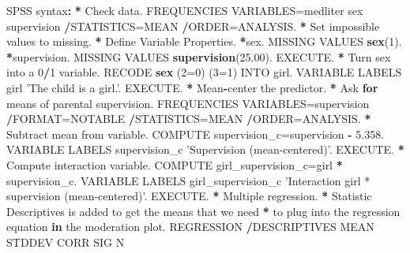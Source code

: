 \documentclass[a4paper]{book}
\newenvironment{Shaded}{\begin{snugshade}}{\end{snugshade}}
\newcommand{\KeywordTok}[1]{\textcolor[rgb]{0,0,0}{\textbf{#1}}}
\newcommand{\DecValTok}[1]{\textcolor[rgb]{0.00,0.00,0.00}{#1}}
\newcommand{\FloatTok}[1]{\textcolor[rgb]{0.00,0.00,0.00}{#1}}
\newcommand{\StringTok}[1]{\textcolor[rgb]{0.00,0.00,0.00}{#1}}
\newcommand{\ControlFlowTok}[1]{\textcolor[rgb]{0.00,0.00,0.00}{\textbf{#1}}}
\newcommand{\OperatorTok}[1]{\textcolor[rgb]{0.00,0.00,0.00}{\textbf{#1}}}
\newcommand{\ErrorTok}[1]{\textcolor[rgb]{0.00,0.00,0.00}{\textbf{#1}}}
\newcommand{\NormalTok}[1]{#1}
\theoremstyle{definition}
\theoremstyle{definition}
\theoremstyle{definition}
\theoremstyle{remark}
\begin{document}
\begin{Shaded}
\begin{Highlighting}[]
\NormalTok{SPSS syntax}\OperatorTok{:}\StringTok{  }
\StringTok{  }
\ErrorTok{*}\StringTok{ }\NormalTok{Check data.  }
\NormalTok{FREQUENCIES VARIABLES=medliter sex supervision  }
  \OperatorTok{/}\NormalTok{STATISTICS=MEAN  }
  \OperatorTok{/}\NormalTok{ORDER=ANALYSIS.  }
\OperatorTok{*}\StringTok{ }\NormalTok{Set impossible values to missing.  }
\OperatorTok{*}\StringTok{ }\NormalTok{Define Variable Properties.  }
\OperatorTok{*}\NormalTok{sex.  }
\NormalTok{MISSING VALUES }\KeywordTok{sex}\NormalTok{(}\DecValTok{1}\NormalTok{).  }
\OperatorTok{*}\NormalTok{supervision.  }
\NormalTok{MISSING VALUES }\KeywordTok{supervision}\NormalTok{(}\FloatTok{25.00}\NormalTok{).  }
\NormalTok{EXECUTE.  }
\OperatorTok{*}\StringTok{ }\NormalTok{Turn sex into a }\DecValTok{0}\OperatorTok{/}\DecValTok{1}\NormalTok{ variable.  }
\NormalTok{RECODE }\KeywordTok{sex}\NormalTok{ (}\DecValTok{2}\NormalTok{=}\DecValTok{0}\NormalTok{) (}\DecValTok{3}\NormalTok{=}\DecValTok{1}\NormalTok{) INTO girl.  }
\NormalTok{VARIABLE LABELS  girl }\StringTok{'The child is a girl.'}\NormalTok{.  }
\NormalTok{EXECUTE.  }
\OperatorTok{*}\StringTok{ }\NormalTok{Mean}\OperatorTok{-}\NormalTok{center the predictor.  }
\OperatorTok{*}\StringTok{ }\NormalTok{Ask }\ControlFlowTok{for}\NormalTok{ means of parental supervision.  }
\NormalTok{FREQUENCIES VARIABLES=supervision  }
  \OperatorTok{/}\NormalTok{FORMAT=NOTABLE  }
  \OperatorTok{/}\NormalTok{STATISTICS=MEAN  }
  \OperatorTok{/}\NormalTok{ORDER=ANALYSIS.  }
\OperatorTok{*}\StringTok{ }\NormalTok{Subtract mean from variable.  }
\NormalTok{COMPUTE supervision_c=supervision }\OperatorTok{-}\StringTok{ }\FloatTok{5.358}\NormalTok{.  }
\NormalTok{VARIABLE LABELS  supervision_c }\StringTok{'Supervision (mean-centered)'}\NormalTok{.  }
\NormalTok{EXECUTE.  }
\OperatorTok{*}\StringTok{ }\NormalTok{Compute interaction variable.  }
\NormalTok{COMPUTE girl_supervision_c=girl }\OperatorTok{*}\StringTok{ }\NormalTok{supervision_c.  }
\NormalTok{VARIABLE LABELS  girl_supervision_c }\StringTok{'Interaction girl * supervision (mean-centered)'}\NormalTok{.  }
\NormalTok{EXECUTE.  }
\OperatorTok{*}\StringTok{ }\NormalTok{Multiple regression.  }
\OperatorTok{*}\StringTok{ }\NormalTok{Statistic Descriptives is added to get the means that we need  }
\OperatorTok{*}\StringTok{ }\NormalTok{to plug into the regression equation }\ControlFlowTok{in}\NormalTok{ the moderation plot.  }
\NormalTok{REGRESSION  }
  \OperatorTok{/}\NormalTok{DESCRIPTIVES MEAN STDDEV CORR SIG N  }

\end{Highlighting}
\end{Shaded}
\end{document}
